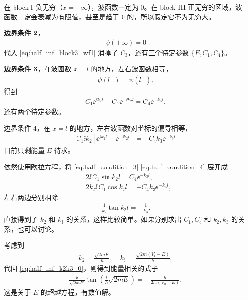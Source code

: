 在 block I 负无穷（$x=-\infty$），波函数一定为 0。在 block III 正无穷的区域，波函数一定会衰减为有限值，甚至是趋于 0 的，所以假定它不为无穷大。

\textbf{边界条件 2}，
\begin{eqnarray}
    \psi(+\infty) = 0 
\end{eqnarray}
代入 \eqref{eq:half_inf_block3_wf1} 消掉了 $C_3$，还有三个待定参数 $\{E, C_1, C_4\}$。

\textbf{边界条件 3}，在波函数 $x = l$ 的地方，左右波函数相等，
\begin{eqnarray}
    \psi(l^-) = \psi(l^+),
\end{eqnarray}
得到
\begin{eqnarray}
    C_1 \ee^{\ii k_2 l} - C_1 \ee^{-\ii k_2 l} = C_4 \ee^{-k_3 l}, \label{eq:half_condition_3}
\end{eqnarray}
还有两个待定参数。

边界条件 4，在 $x=l$ 的地方，左右波函数对坐标的偏导相等，
\begin{eqnarray}
    C_1 \ii k_2 \left[
        \ee^{\ii k_2 l} + \ee^{-\ii k_2 l} 
    \right] = - C_4 k_3 \ee^{-k_3 l} \label{eq:half_condition_4}
\end{eqnarray}
目前只剩能量 $E$ 待求。

依然使用欧拉方程，将 \eqref{eq:half_condition_3} \eqref{eq:half_condition_4} 展开成
\begin{align}
    & 2\ii \,C_1 \sin k_2l = C_4 \ee^{-k_3 l}, \\
    & 2 k_2 \ii \, C_1 \cos k_2 l = - C_4 k_3 \ee^{-k_3 l}, 
\end{align}
左右两边分别相除
\begin{eqnarray}
    \frac1{k_2} \tan k_2l = - \frac1{k_3}. 
    \label{eq:half_inf_k2k3_0}
\end{eqnarray}
直接得到了 $k_2$ 和 $k_3$ 的关系，这样比较简单。如果分别求出 $C_1, C_4$ 和 $k_2, k_3$ 的关系，也可以讨论。

考虑到
\begin{eqnarray}
    k_2 = \frac{\sqrt{2mE}}{\hbar}, \quad k_3 = \frac{\sqrt{2m(V_0- E)}}{\hbar}, \label{eq:half_inf_k2k3_def}
\end{eqnarray}
代回 \eqref{eq:half_inf_k2k3_0}，则得到能量相关的式子
\begin{eqnarray}
    \frac{\hbar}{\sqrt{2mE}} \tan \left(
        \frac l{\hbar} \sqrt{2mE}
    \right)
    = - \frac{\hbar}{2m(V_0 - E)},
    \label{eq:half_inf_k2k3_transcendental}
\end{eqnarray}
这是关于 $E$ 的超越方程，有数值解。


